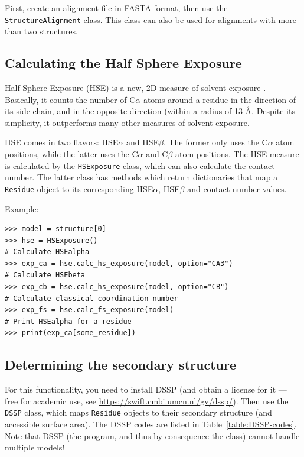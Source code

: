 First, create an alignment file in FASTA format, then use the \texttt{StructureAlignment}
class. This class can also be used for alignments with more than two
structures.

\subsection{Calculating the Half Sphere Exposure}

Half Sphere Exposure (HSE) is a new, 2D measure of solvent exposure
\cite{hamelryck2005}.
Basically, it counts the number of C$\alpha$ atoms around a residue
in the direction of its side chain, and in the opposite direction
(within a radius of 13 \AA. Despite its simplicity, it outperforms
many other measures of solvent exposure.

HSE comes in two flavors: HSE$\alpha$ and HSE$\beta$. The former
only uses the C$\alpha$ atom positions, while the latter uses the
C$\alpha$ and C$\beta$ atom positions. The HSE measure is calculated
by the \texttt{HSExposure} class, which can also calculate the contact
number. The latter class has methods which return dictionaries that
map a \texttt{Residue} object to its corresponding HSE$\alpha$, HSE$\beta$
and contact number values.

Example:

\begin{verbatim}
>>> model = structure[0]
>>> hse = HSExposure()
# Calculate HSEalpha
>>> exp_ca = hse.calc_hs_exposure(model, option="CA3")
# Calculate HSEbeta
>>> exp_cb = hse.calc_hs_exposure(model, option="CB")
# Calculate classical coordination number
>>> exp_fs = hse.calc_fs_exposure(model)
# Print HSEalpha for a residue
>>> print(exp_ca[some_residue])
\end{verbatim}

\subsection{Determining the secondary structure}

For this functionality, you need to install DSSP (and obtain a license
for it --- free for academic use, see \url{https://swift.cmbi.umcn.nl/gv/dssp/}).
Then use the \texttt{DSSP} class, which maps \texttt{Residue} objects
to their secondary structure (and accessible surface area). The DSSP
codes are listed in Table~\ref{table:DSSP-codes}. Note that DSSP (the
program, and thus by consequence the class) cannot handle multiple
models!

